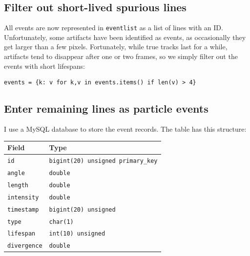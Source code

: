 \documentclass[notitlepage]{article}
\begin{document}
\subsection{Filter out short-lived spurious lines}

All events are now represented in \texttt{eventlist} as a list of lines with an ID.  Unfortunately, some artifacts have been identified as events, as occasionally they get larger than a few pixels.  Fortunately, while true tracks last for a while, artifacts tend to disappear after one or two frames, so we simply filter out the events with short lifespans:
\begin{lstlisting}
events = {k: v for k,v in events.items() if len(v) > 4}
\end{lstlisting}

\subsection{Enter remaining lines as particle events}

I use a MySQL database to store the event records.  The table has this structure:\\

\begin{tabular}{|l|l|}
	\hline
	Field & Type \\ \hline
	\texttt{id} & \texttt{bigint(20) unsigned primary\_key} \\ \hline
	\texttt{angle} & \texttt{double} \\ \hline
	\texttt{length} & \texttt{double} \\ \hline
	\texttt{intensity} & \texttt{double} \\ \hline
	\texttt{timestamp} & \texttt{bigint(20) unsigned} \\ \hline
	\texttt{type} & \texttt{char(1)} \\ \hline
	\texttt{lifespan} & \texttt{int(10) unsigned} \\ \hline
	\texttt{divergence} & \texttt{double} \\ \hline
\end{tabular}
\\[10pt]
\end{document}
